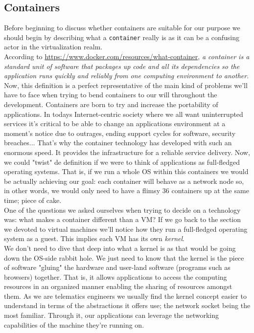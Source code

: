         \subsection{Containers}
            Before beginning to discuss whether containers are suitable for our purpose we should begin by describing what a \texttt{container} really is as it can be a confusing actor in the virtualization realm.\\

            According to \href{docker.com}{https://www.docker.com/resources/what-container}, \textit{a container is a standard unit of software that packages up code and all its dependencies so the application runs quickly and reliably from one computing environment to another}. Now, this definition is a perfect representative of the main kind of problems we'll have to face when trying to bend containers to our will throughout the development. Containers are born to try and increase the portability of applications. In todays Internet-centric society where we all want uninterrupted services it's critical to be able to change an applications environment at a moment's notice due to outrages, ending support cycles for software, security breaches... That's why the container technology has developed with such an enormous speed. It provides the infrastructure for a reliable service delivery. Now, we could "twist" de definition if we were to think of applications as full-fledged operating systems. That is, if we run a whole OS within this containers we would be actually achieving our goal: each container will behave as a network node so, in other words, we would only need to have a flimsy $36$ containers up at the same time; piece of cake.\\

            One of the questions we asked ourselves when trying to decide on a technology was: what makes a container different than a VM? If we go back to the section we devoted to virtual machines we'll notice how they run a full-fledged operating system as a guest. This implies each VM has its own \textit{kernel}.\\

            We don't need to dive that deep into what a kernel is as that would be going down the OS-side rabbit hole. We just need to know that the kernel is the piece of software "gluing" the hardware and user-land software (programs such as browsers) together. That is, it allows applications to access the computing resources in an organized manner enabling the sharing of resources amongst them. As we are telematics engineers we usually find the kernel concept easier to understand in terms of the abstractions it offers use; the network socket being the most familiar. Through it, our applications can leverage the networking capabilities of the machine they're running on.\\

